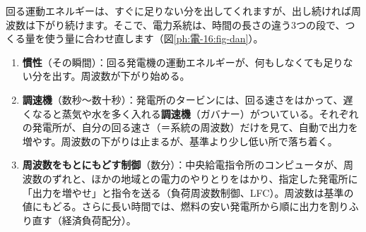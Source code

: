 回る運動エネルギーは、すぐに足りない分を出してくれますが、出し続ければ周波数は下がり続けます。そこで、電力系統は、時間の長さの違う3つの段で、つくる量を使う量に合わせ直します（図\ref{ph:電-16:fig-dan}）。
\begin{enumerate}[label={\sffamily\bfseries 段\arabic*}, leftmargin=2.4\zw, itemsep=2pt, topsep=2pt]
\item \textbf{慣性}（その瞬間）：回る発電機の運動エネルギーが、何もしなくても足りない分を出す。周波数が下がり始める。
\item \textbf{調速機}（数秒〜数十秒）：発電所のタービンには、回る速さをはかって、遅くなると蒸気や水を多く入れる\textbf{調速機}（ガバナー）がついている。それぞれの発電所が、自分の回る速さ（＝系統の周波数）だけを見て、自動で出力を増やす。周波数の下がりは止まるが、基準より少し低い所で落ち着く。
\item \textbf{周波数をもとにもどす制御}（数分）：中央給電指令所のコンピュータが、周波数のずれと、ほかの地域との電力のやりとりをはかり、指定した発電所に「出力を増やせ」と指令を送る（負荷周波数制御、LFC）。周波数は基準の値にもどる。さらに長い時間では、燃料の安い発電所から順に出力を割りふり直す（経済負荷配分）。
\end{enumerate}
